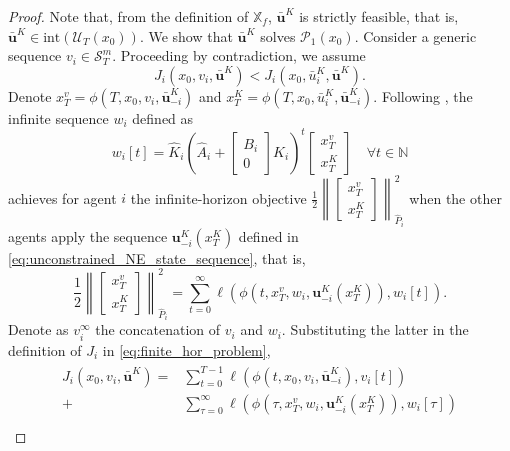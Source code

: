 \documentclass[letterpaper, 10 pt, conference]{ieeeconf}  %
\newcommand{\N}{\mathbb{N}}
\newcommand{\mc}{\mathcal}
\newcommand{\bu}{\boldsymbol{u}}
\newcommand{\X}{\mathbb{X}}
\newcommand{\tsum}{\textstyle\sum}
\begin{document}
\begin{proof}
    Note that, from the definition of $\X_f$, $\bar{\bu}^K$ is strictly feasible, that is, $\bar{\bu}^K\in\mathrm{int}(\mc U_T(x_0))$. We show that $\bar{\bu}^K$ solves $\mc P_1(x_0)$. Consider a generic sequence $v_i\in\mc S_T^m$. Proceeding by contradiction, we assume
    \begin{equation}\label{eq:contradiction_assumption}
        J_i(x_0, v_i, \bar{\bu}^K) < J_i(x_0,\bar{u}_i^K,\bar{\bu}^K).
    \end{equation}
    Denote $x^v_T = \phi(T, x_0, v_i, \bar{\bu}_{-i}^K)$ and $x^K_T = \phi(T, x_0, \bar{u}_i^K, \bar{\bu}_{-i}^K)$. 
    Following \cite[Lemma 1]{benenati2024linear}, the infinite sequence $w_i$ defined as
    \begin{equation}
        w_i[t]  = \hat{K}_i \left(\hat{A}_i + \begin{bmatrix}
            B_i \\0
        \end{bmatrix} \hat{K}_i\right)^t \begin{bmatrix}
            x_T^v \\ x_T^K
        \end{bmatrix} \quad \forall t\in\N
    \end{equation}
    achieves for agent $i$ the infinite-horizon objective $\tfrac{1}{2}\left\|\begin{bmatrix} 
            x_T^v \\ x_T^K
        \end{bmatrix} \right\|^2_{\hat{P}_i}$ when the other agents apply the sequence $\bu^K_{-i}(x_T^K)$ defined in \eqref{eq:unconstrained_NE_state_sequence}, that is,
    \begin{equation}
        \frac{1}{2}\left\|\begin{bmatrix}
            x_T^v \\ x_T^K
        \end{bmatrix} \right\|^2_{\hat{P}_i} = \sum_{t=0}^\infty \ell(\phi(t, x_T^v, w_i, \bu^K_{-i}(x_T^K)) , w_i[t] ).
    \end{equation}
    Denote as $v_i^{\infty}$ the concatenation of $v_i$ and $w_i$. 
    Substituting the latter in the definition of $J_i$ in \eqref{eq:finite_hor_problem},
    \begin{align} 
    \begin{split}
        J_i(x_0, v_i, \bar{\bu}^K) =& \tsum_{t=0}^{T-1} \ell(\phi(t, x_0, v_i, \bar{\bu}^K_{-i}), v_i[t] ) \\
        +&\tsum_{\tau=0}^{\infty} \ell(\phi(\tau, x_T^v, w_i, \bu^K_{-i}(x_T^K)) , w_i[\tau] ) \\

\end{split}
\end{align}
\end{proof}
\end{document}
